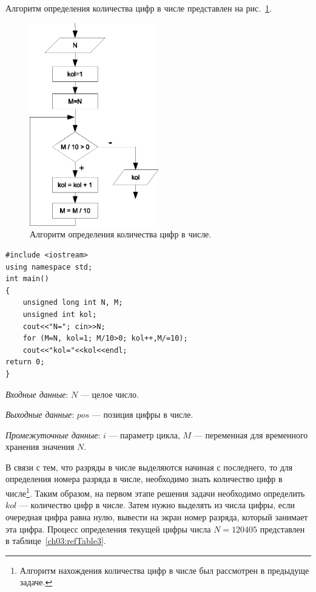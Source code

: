 Алгоритм определения количества цифр в числе представлен на рис.~\ref{ch03:refDrawing32}.

\begin{figure}[htb]
\begin{center}
\includegraphics[width=0.5\textwidth]{img/ris_3_33}
\caption{Алгоритм определения количества цифр в числе.}
\label{ch03:refDrawing32}
\end{center}
\end{figure}

\begin{lstlisting}
#include <iostream>
using namespace std;
int main()
{
	unsigned long int N, M;
	unsigned int kol;
	cout<<"N="; cin>>N;
	for (M=N, kol=1; M/10>0; kol++,M/=10);
	cout<<"kol="<<kol<<endl;
return 0;
}
\end{lstlisting}


\emph{Входные данные}: $N$ --- целое число. 

\emph{Выходные данные}: $pos$ --- позиция цифры в числе. 

\emph{Промежуточные данные}: $i$ --- параметр цикла, $M$ --- переменная для
временного хранения значения $N$.

В связи с тем, что разряды в числе выделяются начиная с последнего, то для определения номера разряда в числе,
необходимо знать количество цифр в числе\footnote{Алгоритм нахождения количества цифр в числе был рассмотрен в
предыдуще задаче.}. Таким образом, на первом этапе решения задачи необходимо определить $kol$ ---
количество цифр в числе. Затем нужно выделять из числа цифры, если очередная цифра равна нулю, вывести на экран номер
разряда, который занимает эта цифра. Процесс определения текущей цифры числа
$N=120405$ представлен в таблице~\ref{ch03:refTable3}.

